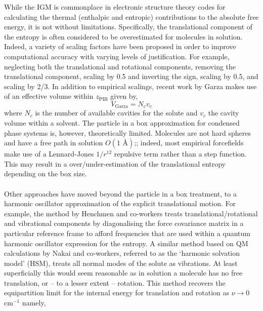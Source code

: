 \documentclass[../main.tex]{subfiles}
\begin{document}
While the IGM is commonplace in electronic structure theory codes for calculating the thermal (enthalpic and entropic) contributions to the absolute free energy, it is not without limitations. Specifically, the translational component of the entropy is often considered to be overestimated for molecules in solution.\cite{Gilson2010} Indeed, a variety of scaling factors have been proposed in order to improve computational accuracy with varying levels of justification. For example, neglecting both the translational and rotational components,\cite{Sumimoto2004} removing the translational component,\cite{Tanaka2011} scaling by 0.5 and inverting the sign,\cite{Deubel2006} scaling by 0.5,\cite{Li2016} and scaling by 2/3.\cite{DiTommaso2010} In addition to empirical scalings, recent work by Garza\cite{Garza2019} makes use of an effective volume within $z_\text{PIB}$ given by,
\begin{equation}
V_\text{Garza} = N_c v_c
\end{equation}
where $N_c$ is the number of available cavities for the solute and $v_c$ the cavity volume within a solvent. The particle in a box approximation for condensed phase systems is, however, theoretically limited. Molecules are not hard spheres and have a free path in solution $O(1 \text{ \AA})$;\cite{Herman2016}; indeed, most empirical forcefields make use of a Lennard-Jones $1/r^{12}$ repulsive term rather than a step function. This may result in a over/under-estimation of the translational entropy depending on the box size.
\\\\
Other approaches have moved beyond the particle in a box treatment, to a harmonic oscillator approximation of the explicit translational motion. For example, the method by Henchmen and co-workers treats  translational/rotational and vibrational components by diagonalising the force covariance matrix in a particular reference frame to afford frequencies that are used within a quantum harmonic oscillator expression for the entropy.\cite{Chakravorty2020, Ali2019} A similar method based on QM calculations by Nakai and co-workers, referred to as the `harmonic solvation model' (HSM), treats all normal modes of the solute as vibrations.\cite{Nakai2014} At least superficially this would seem reasonable as in solution a molecule has no free translation, or -- to a lesser extent -- rotation. This method recovers the equipartition limit for the internal energy for translation and rotation as $\nu \rightarrow 0$ cm$^{-1}$ namely,
\end{document}
